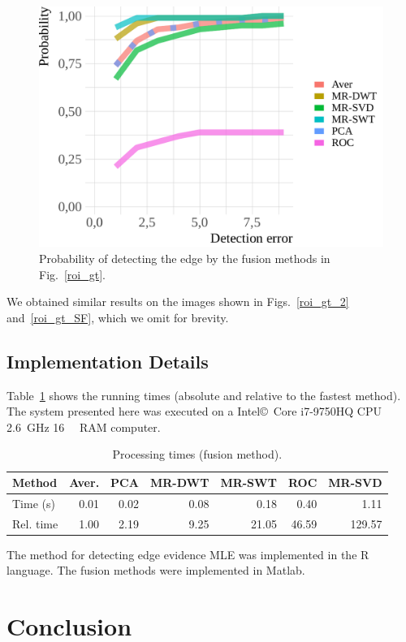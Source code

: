 \documentclass[journal]{IEEEtran}
\begin{document}
\begin{figure}[hbt]
	\centering
	\includegraphics[width=.7\linewidth]{metricas_6_fusao_flevoland}
	\caption{Probability of detecting the edge by the fusion methods in Fig.~\ref{roi_gt}.}
	\label{probability_edge_detc}
\end{figure}

We obtained similar results on the images shown in Figs.~\ref{roi_gt_2} and~\ref{roi_gt_SF}, which we omit for brevity.

\subsection{Implementation Details}

Table~\ref{metrica_de_tempo} shows the running times (absolute and relative to the fastest method).
The system presented here was executed on a Intel\copyright\ Core i7-9750HQ CPU \SI{2.6}{\giga\hertz} \SI{16}{\giga\byte} RAM computer.  

\begin{table}[hbt]
	\centering
	\caption{Processing times (fusion method).}\label{metrica_de_tempo}
	\begin{tabular}{@{}lrrrrrr@{}} \toprule
		Method       & Aver.   &   PCA      &  MR-DWT  & MR-SWT &  ROC  &  MR-SVD \\ \midrule
		Time (s)      & 0.01      & 0.02       &  0.08 & 0.18      &  0.40       & 1.11  \\
		Rel. time     & 1.00      & 2.19       &  9.25 & 21.05     &  46.59      & 129.57  \\ \bottomrule
	\end{tabular}
\end{table}

The method for detecting edge evidence MLE was implemented in the R language.
The fusion methods were implemented in Matlab. 


\section{Conclusion}\label{sec_06}
\end{document}
